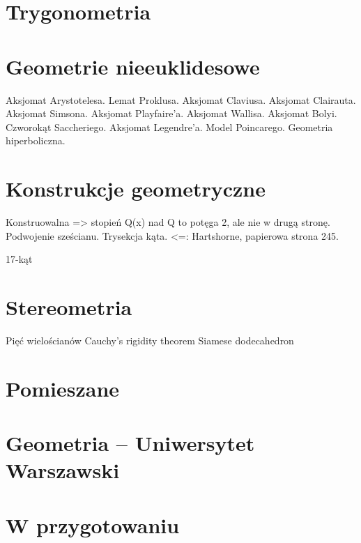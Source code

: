 \documentclass{greaseproof}
\begin{document}
\section{Trygonometria}


\section{Geometrie nieeuklidesowe}
Aksjomat Arystotelesa.
Lemat Proklusa.
Aksjomat Claviusa.
Aksjomat Clairauta.
Aksjomat Simsona.
Aksjomat Playfaire'a.
Aksjomat Wallisa.
Aksjomat Bolyi.
Czworokąt Saccheriego.
Aksjomat Legendre'a.
Model Poincarego.
Geometria hiperboliczna.

\section{Konstrukcje geometryczne}
Konstruowalna => stopień Q(x) nad Q to potęga 2, ale nie w drugą stronę.
Podwojenie sześcianu.
Trysekcja kąta.
<=: Hartshorne, papierowa strona 245.

17-kąt

\section{Stereometria}
Pięć wielościanów
Cauchy's rigidity theorem %
Siamese dodecahedron

\section{Pomieszane}









\section{Geometria -- Uniwersytet Warszawski}






\section{W przygotowaniu}


{}


\raggedright
{}
\printindex

\printindex[persons]
\end{document}
